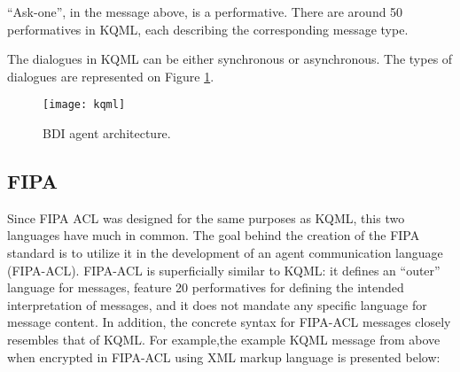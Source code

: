  ``Ask-one'', in the message above, is a performative. There are around 50 performatives in KQML, each describing the corresponding message type.\par
 The dialogues in KQML can be either synchronous or asynchronous. The types of dialogues are represented on Figure \ref{KQMLDialog}.
    \begin{figure}[h!]
      \begin{center}
     \texttt{[image: kqml]}
      \caption{BDI agent architecture.}
      \label{KQMLDialog}
      \end{center}
    \end{figure}

\subsection{FIPA}
Since FIPA ACL was designed for the same purposes as KQML, this two languages have much in common.
The goal behind the creation of the FIPA standard is to utilize it in the development of an agent communication language (FIPA-ACL).  FIPA-ACL is superficially similar to KQML: it defines an ``outer'' language for messages, feature 20 performatives for defining the intended interpretation of messages, and it does not mandate any specific language for message content. In addition, the concrete syntax for FIPA-ACL messages closely resembles that of KQML. For example,the example KQML message from above when encrypted in FIPA-ACL using XML markup language is presented below:
\addtolength{\jot}{-10pt}
